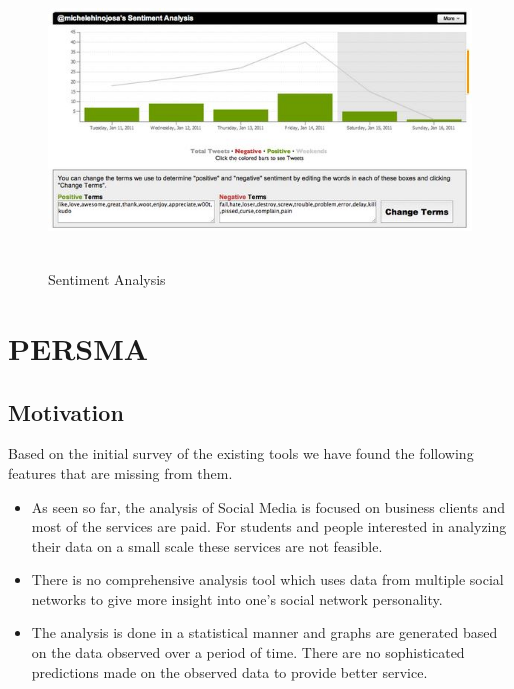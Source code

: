 \documentclass[12pt]{ucthesis}
\newcommand{\captionfonts}{\small\bf\ssp}
\begin{document}
\begin{itemize}
  \begin{figure}[!htb]
  \begin{center}
  \includegraphics[height=70mm, width=.99\linewidth]{sentimentanalysis.JPG}
  \captionfonts
  \caption[Sentiment Analysis]{Sentiment Analysis}
  \label{sentanalysis}
  \end{center}
  \end{figure}%
  
\end{itemize}

\chapter{PERSMA}
\label{ch2}

\section{Motivation}
\label{ch2s1}
Based on the initial survey of the existing tools we have found the following features that are missing from them. 
\begin{itemize}
\item As seen so far, the analysis of Social Media is focused on business clients and most of the services are paid. For students and people interested in analyzing their data on a small scale these services are not feasible. 
\item There is no comprehensive analysis tool which uses data from multiple social networks to give more insight into one's social network personality. 
\item The analysis is done in a statistical manner and graphs are generated based on the data observed over a period of time. There are no sophisticated predictions made on the observed data to provide better service. 
\end{itemize}
\end{document}
